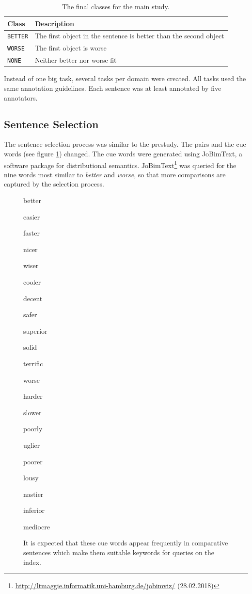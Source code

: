 \begin{table}[h]
\centering
\caption{The final classes for the main study.}
\label{tbl:mainstudy-classes}
\begin{tabular}{@{}ll@{}}
\toprule
Class & Description \\ \midrule
\texttt{BETTER} & The first object in the sentence is better than the second object\\
\texttt{WORSE} & The first object is worse \\
\texttt{NONE} & Neither better nor worse fit\\
\bottomrule
\end{tabular}
\end{table}

Instead of one big task, several tasks per domain were created. All tasks used the same annotation guidelines. Each sentence was at least annotated by five annotators.


\subsection{Sentence Selection}
The sentence selection process was similar to the prestudy. The pairs and the cue words (see figure \ref{fig:cue_words}) changed. The cue words were generated using JoBimText, a software package for distributional semantics. JoBimText\footnote{\url{http://ltmaggie.informatik.uni-hamburg.de/jobimviz/} (28.02.2018)} was queried for the nine words most similar to \emph{better} and \emph{worse}, so that more comparisons are captured by the selection process.

\begin{figure}[hb]
\centering
\caption{It is expected that these cue words appear frequently in comparative sentences which make them suitable keywords for queries on the index.}
\label{fig:cue_words}
\begin{multicols}{4}
better

easier

faster

nicer

wiser

cooler

decent

safer

superior

solid

terrific

worse

harder

slower

poorly

uglier

poorer

lousy

nastier

inferior

mediocre
\end{multicols}
\end{figure}

